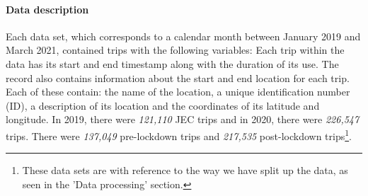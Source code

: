 \documentclass[11pt,a4paper]{article}
\begin{document}
\paragraph{Data description}
Each data set, which corresponds to a calendar month between January 2019 and March 2021, contained trips with the following variables: \newline Each trip within the data has its start and end timestamp along with the duration of its use. The record also contains information about the start and end location for each trip. Each of these contain: the name of the location, a unique identification number (ID), a description of its location and the coordinates of its latitude and longitude. In 2019, there were \emph{121,110} JEC trips and in 2020, there were \emph{226,547} trips. There were \emph{137,049} pre-lockdown trips and \emph{217,535} post-lockdown trips\footnote{These data sets are with reference to the way we have split up the data, as seen in the 'Data processing' section.}.
\end{document}
